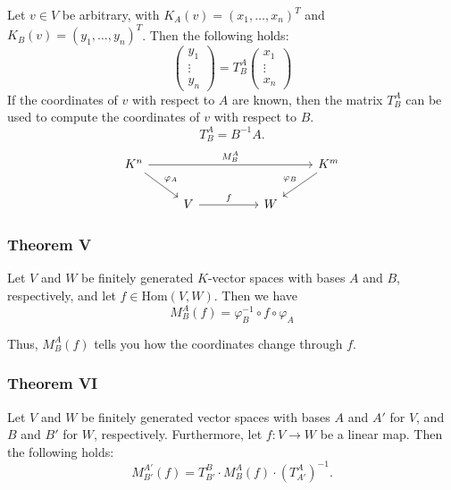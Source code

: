 Let \( v \in V \) be arbitrary, 
with \( K_A(v) = {(x_1, \dots, x_n)}^T \) 
and \( K_B(v) = {(y_1, \dots, y_n)}^T \).  
Then the following holds:
\[
\begin{pmatrix}
y_1 \\
\vdots \\
y_n
\end{pmatrix}
=
T_B^A
\begin{pmatrix}
x_1 \\
\vdots \\
x_n
\end{pmatrix}
\]
If the coordinates of \( v \) with respect to \( A \) are known, then the matrix \( T_B^A \) can be used to compute the coordinates of \( v \) with respect to \( B \).
\[ T_B^A = B^{-1}A. \]
\[
    \begin{tikzcd}
        K^n \arrow[rrrr, "M_{B}^{A}"] \arrow[rd, "\varphi_A"] &                   &  &   & K^m \arrow[ld, "\varphi_B"'] \\
                                                              & V \arrow[rr, "f"] &  & W &                             
        \end{tikzcd}
\]

\subsubsection{Theorem V}
 
Let \( V \) and \( W \) be finitely 
generated \( K \)-vector spaces with 
bases \( A \) and \( B \), respectively, and let \( f \in \mathrm{Hom}(V, W) \).
Then we have
\[
M_B^A(f) = \varphi_B^{-1} \circ f \circ \varphi_A
\]

Thus, \( M_B^A(f) \) tells you how the coordinates change through \( f \).

\subsubsection{Theorem VI} 

Let \( V \) and \( W \) be finitely generated vector spaces with bases \( A \) and \( A' \) for \( V \), and \( B \) and \( B' \) for \( W \), respectively.  
Furthermore, let \( f: V \to W \) be a linear map. Then the following holds:
\[
M_{B'}^{A'}(f) = T_{B'}^{B} \cdot M_{B}^{A}(f) \cdot {\left( T_{A'}^{A} \right)}^{-1}.
\]

